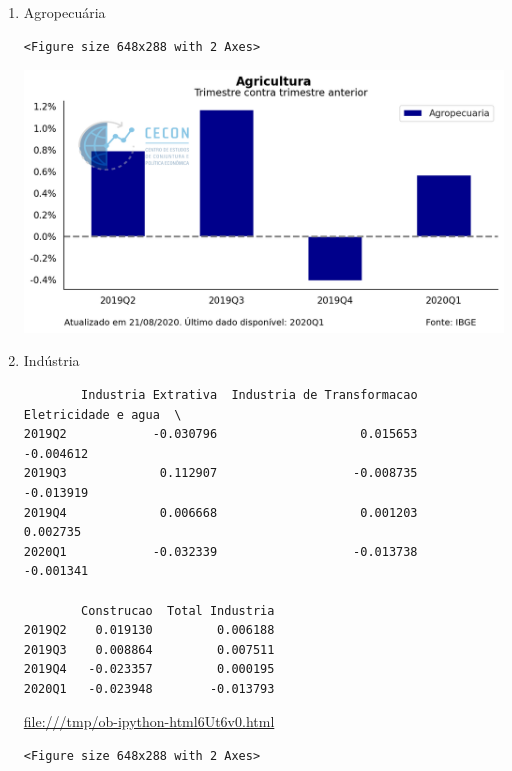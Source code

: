 \documentclass[11pt]{article}
\begin{document}
\begin{enumerate}
\item Agropecuária
\label{sec:org18364df}

\begin{verbatim}
<Figure size 648x288 with 2 Axes>
\end{verbatim}


\begin{center}
\includegraphics[width=.9\linewidth]{obipy-resources/62e383af79e91b63c7fc98dd7fb55b3c3ececcb9/3567d5d74a87a0022c1b5d021b8202e9643e9c6d.png}
\end{center}

\item Indústria
\label{sec:org657ab48}

\begin{verbatim}
        Industria Extrativa  Industria de Transformacao  Eletricidade e agua  \
2019Q2            -0.030796                    0.015653            -0.004612   
2019Q3             0.112907                   -0.008735            -0.013919   
2019Q4             0.006668                    0.001203             0.002735   
2020Q1            -0.032339                   -0.013738            -0.001341   

        Construcao  Total Industria  
2019Q2    0.019130         0.006188  
2019Q3    0.008864         0.007511  
2019Q4   -0.023357         0.000195  
2020Q1   -0.023948        -0.013793  
\end{verbatim}


\url{file:///tmp/ob-ipython-html6Ut6v0.html}

\begin{verbatim}
<Figure size 648x288 with 2 Axes>
\end{verbatim}



\end{enumerate}
\end{document}
